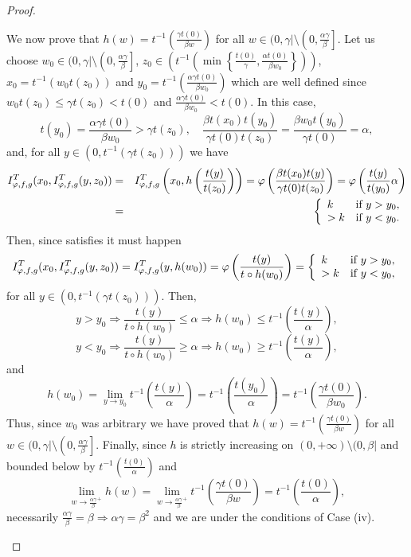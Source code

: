 \begin{proof}
\begin{itemize}
		We now prove that $h(w) = t^{-1} \left(\frac{\gamma t(0)}{\beta w}\right)$ for all $w \in (0,\gamma | \setminus \left(0,\frac{\alpha \gamma}{\beta}\right]$. Let us choose $w_0 \in (0,\gamma | \setminus \left(0,\frac{\alpha \gamma}{\beta}\right]$, $z_0 \in \left(t^{-1} \left(\min \left \{ \frac{t(0)}{\gamma}, \frac{\alpha t(0)}{\beta w_0}\right\}\right)\right)$, $x_0 = t^{-1}(w_0t(z_0))$ and $y_0  = t^{-1} \left(\frac{\alpha \gamma t(0)}{\beta w_0}\right)$ which are well defined since $w_0t(z_0) \leq \gamma t(z_0) < t(0)$ and $\frac{\alpha \gamma t(0)}{\beta w_0} < t(0)$. In this case,
		$$t(y_0) = \frac{\alpha \gamma t(0)}{\beta w_0} > \gamma t(z_0), \quad \frac{\beta t(x_0) t(y_0)}{\gamma t(0) t(z_0)} = \frac{\beta w_0 t(y_0)}{\gamma t(0)} = \alpha,$$
		and, for all $y \in (0, t^{-1}(\gamma t(z_0)))$ we have
		\begin{eqnarray*}
		I^T_{\varphi,f,g}(x_0,I^T_{\varphi,f,g}(y,z_0)) &=& I^T_{\varphi,f,g} \left(x_0, h \left(\frac{t(y)}{t(z_0)}\right)\right) = \varphi \left(\frac{\beta t(x_0)t(y)}{\gamma t(0) t(z_0)}\right) = 	\varphi \left(\frac{t(y)}{t(y_0)}\alpha\right) \\
		&=&	\left\{ \begin{array}{ll}
			k &  \text{if }  y > y_0, \\
			>k & \text{if }y < y_0.
		\end{array}
		\right.
		\end{eqnarray*}
		Then, since \IT satisfies \EP it must happen
		$$I^T_{\varphi,f,g}(x_0,I^T_{\varphi,f,g}(y,z_0)) = I^T_{\varphi,f,g}(y,h(w_0)) = \varphi \left(\frac{t(y)}{t \circ h(w_0)}\right) =
		\left\{ \begin{array}{ll}
			k &  \text{if }  y > y_0, \\
			>k & \text{if }y < y_0,
		\end{array}
		\right.$$
		for all $y \in (0, t^{-1}(\gamma t(z_0)))$. Then,
		$$y > y_0 \Rightarrow \frac{t(y)}{t \circ h(w_0)} \leq \alpha \Rightarrow h(w_0) \leq t^{-1} \left(\frac{t(y)}{\alpha}\right),$$
		$$y < y_0 \Rightarrow \frac{t(y)}{t \circ h(w_0)} \geq \alpha \Rightarrow h(w_0) \geq t^{-1} \left(\frac{t(y)}{\alpha}\right),$$
		and
		$$h(w_0) = \lim_{y \to y_0} t^{-1} \left(\frac{t(y)}{\alpha}\right) = t^{-1} \left(\frac{t(y_0)}{\alpha}\right) = t^{-1} \left(\frac{\gamma t(0)}{\beta w_0}\right).$$
		Thus, since $w_0$ was arbitrary we have proved that $h(w) = t^{-1} \left(\frac{\gamma t(0)}{\beta w}\right)$ for all $w \in (0,\gamma | \setminus \left(0,\frac{\alpha \gamma}{\beta}\right]$. Finally, since $h$ is strictly increasing on $(0,+\infty) \setminus (0,\beta|$ and bounded below by $t^{-1} \left(\frac{t(0)}{\alpha}\right)$ and
		$$\lim_{w \to \frac{\alpha \gamma}{\beta}^+} h(w) =  \lim_{w \to \frac{\alpha \gamma}{\beta}^+} t^{-1} \left(\frac{\gamma t(0)}{\beta w}\right) = t^{-1} \left(\frac{t(0)}{\alpha}\right),$$
		necessarily $\frac{\alpha \gamma}{\beta} = \beta \Rightarrow \alpha \gamma = \beta^2$ and we are under the conditions of Case (iv).
	\end{itemize}
\end{proof}


